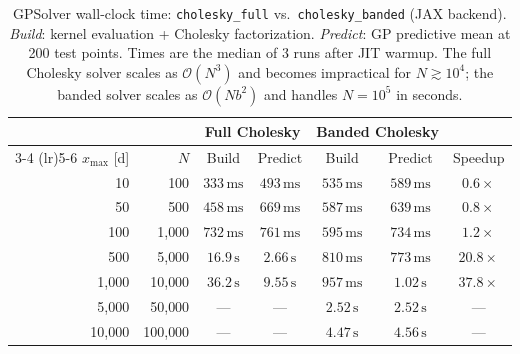 \begin{table}[ht!]
    \centering
    \caption{GPSolver wall-clock time: \texttt{cholesky\_full} vs.\ \texttt{cholesky\_banded} (JAX backend). \textit{Build}: kernel evaluation + Cholesky factorization. \textit{Predict}: GP predictive mean at 200 test points. Times are the median of 3 runs after JIT warmup. The full Cholesky solver scales as $\mathcal{O}(N^3)$ and becomes impractical for $N \gtrsim 10^4$; the banded solver scales as $\mathcal{O}(Nb^2)$ and handles $N = 10^5$ in seconds.}
    \label{tab:banded_vs_full}
    \begin{tabular}{rr cc cc c}
    \toprule
    & & \multicolumn{2}{c}{Full Cholesky} & \multicolumn{2}{c}{Banded Cholesky} & \\
    \cmidrule(lr){3-4} \cmidrule(lr){5-6}
    $x_{\max}$ [d] & $N$ & Build & Predict & Build & Predict & Speedup \\
    \midrule
    10 & 100 & $333\,\text{ms}$ & $493\,\text{ms}$ & $535\,\text{ms}$ & $589\,\text{ms}$ & $0.6\times$ \\
    50 & 500 & $458\,\text{ms}$ & $669\,\text{ms}$ & $587\,\text{ms}$ & $639\,\text{ms}$ & $0.8\times$ \\
    100 & 1{,}000 & $732\,\text{ms}$ & $761\,\text{ms}$ & $595\,\text{ms}$ & $734\,\text{ms}$ & $1.2\times$ \\
    500 & 5{,}000 & $16.9\,\text{s}$ & $2.66\,\text{s}$ & $810\,\text{ms}$ & $773\,\text{ms}$ & $20.8\times$ \\
    1{,}000 & 10{,}000 & $36.2\,\text{s}$ & $9.55\,\text{s}$ & $957\,\text{ms}$ & $1.02\,\text{s}$ & $37.8\times$ \\
    5{,}000 & 50{,}000 & --- & --- & $2.52\,\text{s}$ & $2.52\,\text{s}$ & --- \\
    10{,}000 & 100{,}000 & --- & --- & $4.47\,\text{s}$ & $4.56\,\text{s}$ & --- \\
    \bottomrule
    \end{tabular}
\end{table}
